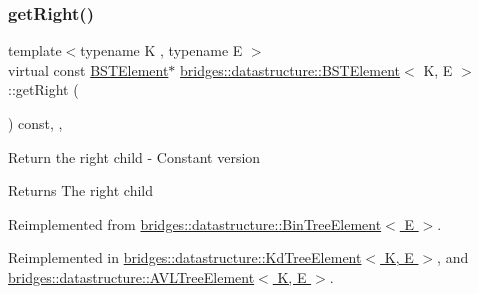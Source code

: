 \mbox{\label{classbridges_1_1datastructure_1_1_b_s_t_element_a012f0eb09c3d62b14c73109e6ded0879}} 
\subsubsection{\texorpdfstring{get\+Right()}{getRight()}\hspace{0.1cm}{\footnotesize\ttfamily [2/2]}}
{\footnotesize\ttfamily template$<$typename K , typename E $>$ \\
virtual const \hyperlink{classbridges_1_1datastructure_1_1_b_s_t_element}{B\+S\+T\+Element}$\ast$ \hyperlink{classbridges_1_1datastructure_1_1_b_s_t_element}{bridges\+::datastructure\+::\+B\+S\+T\+Element}$<$ K, E $>$\+::get\+Right (\begin{DoxyParamCaption}{ }\end{DoxyParamCaption}) const\hspace{0.3cm}{\ttfamily [inline]}, {\ttfamily [override]}, {\ttfamily [virtual]}}

Return the right child -\/ Constant version \begin{DoxyReturn}{Returns}
The right child 
\end{DoxyReturn}


Reimplemented from \hyperlink{classbridges_1_1datastructure_1_1_bin_tree_element_a795b1696d628b55dafb2bc1aa961843a}{bridges\+::datastructure\+::\+Bin\+Tree\+Element$<$ E $>$}.



Reimplemented in \hyperlink{classbridges_1_1datastructure_1_1_kd_tree_element_ae8d6007d3848b72cbfc11d2e29120781}{bridges\+::datastructure\+::\+Kd\+Tree\+Element$<$ K, E $>$}, and \hyperlink{classbridges_1_1datastructure_1_1_a_v_l_tree_element_a5a2c4b96b51da1daa3c0426882250acb}{bridges\+::datastructure\+::\+A\+V\+L\+Tree\+Element$<$ K, E $>$}.

\mbox{\label{classbridges_1_1datastructure_1_1_b_s_t_element_a06d80480736ae19052e2d1bc6345323a}} 
